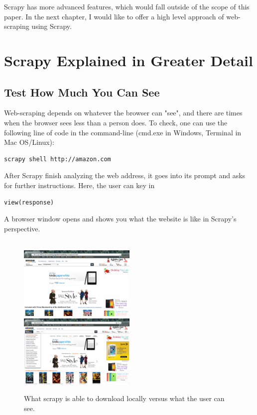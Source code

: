\documentclass[12pt]{report}
\begin{document}
Scrapy has more advanced features, which would fall outside of the scope of this paper. In the next chapter, I would like to offer a high level approach of web-scraping using Scrapy.

\chapter{Scrapy Explained in Greater Detail}

\section{Test How Much You Can See}
Web-scraping depends on whatever the browser can "see", and there are times when the browser sees less than a person does. To check, one can use the following line of code in the command-line (cmd.exe in Windows, Terminal in Mac OS/Linux): 
\begin{lstlisting}
scrapy shell http://amazon.com
\end{lstlisting}
After Scrapy finish analyzing the web address, it goes into its prompt and asks for further instructions. Here, the user can key in 
\begin{lstlisting}
view(response)
\end{lstlisting} 
A browser window opens and shows you what the website is like in Scrapy's perspective.\\
\\
\begin{figure}[htp]
\includegraphics[width=0.5\textwidth]{amazon_scrapy_view.png}
\includegraphics[width=0.5\textwidth]{amazon_normal_view.png}
\caption[Comparison of views]
{What scrapy is able to download locally versus what the user can see.}
\end{figure}
\end{document}
